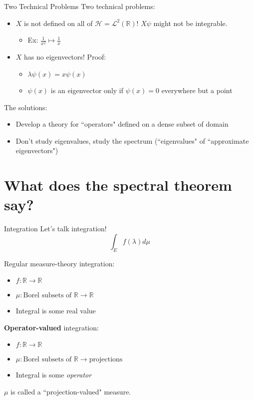 \documentclass{beamer}
\theoremstyle{plain}
\theoremstyle{definition}
\renewcommand{\l}{\lambda}
\newcommand{\cH}{{\mathcal H}}
\newcommand{\cL}{{\mathcal L}}
\newcommand{\bR}{{\mathbb R}}
\begin{document}
\begin{frame}{Two Technical Problems}
    Two technical problems:
    \begin{itemize}
        \item $X$ is not defined on all of $\cH = \cL^2(\bR)$! $X\psi$ might not be integrable.
            \begin{itemize}
                \item Ex: $ \frac{1}{x^2} \mapsto \frac{1}{x}$
            \end{itemize}
        \item $X$ has no eigenvectors! Proof:
            \begin{itemize}
                \item $\l \psi(x) = x\psi(x)$
                \item $\psi(x)$ is an eigenvector only if $\psi(x) = 0$ everywhere but a point
            \end{itemize}
    \end{itemize}

    \pause
    \bigskip
    The solutions:
    \begin{itemize}
        \item Develop a theory for ``operators" defined on a dense subset of domain
        \item Don't study eigenvalues, study the spectrum (``eigenvalues" of ``approximate eigenvectors")
    \end{itemize}
\end{frame}

\section*{What does the spectral theorem say?}

\begin{frame}{Integration}
    Let's talk integration!
    \[
        \int_E f(\l) d\mu
    \]

    \bigskip
    Regular measure-theory integration:
    \begin{itemize}
        \item $f: \bR \rightarrow \bR$
        \item $\mu: \text{Borel subsets of } \bR \rightarrow \bR$
        \item Integral is some real value
    \end{itemize}

    \pause
    \bigskip
    \textbf{Operator-valued} integration:
    \begin{itemize}
        \item $f: \bR \rightarrow \bR$
        \item $\mu: \text{Borel subsets of } \bR \rightarrow \text{projections}$
        \item Integral is some \textit{operator}
    \end{itemize}

    $\mu$ is called a ``projection-valued" measure.
\end{frame}
\end{document}
